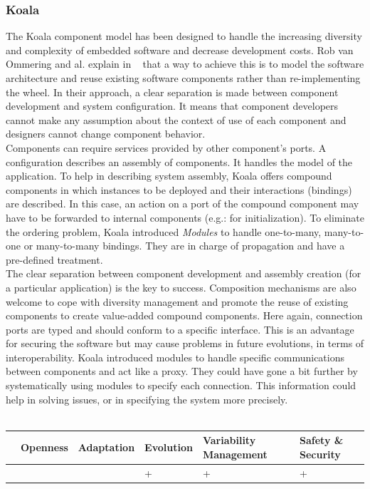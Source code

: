 \subsubsection{Koala}

The Koala component model has been designed to handle the increasing diversity and complexity of embedded software and decrease development costs. Rob van Ommering and al. explain in ~\cite{RobVanOmmering:2000} that a way to achieve this is to model the software architecture and reuse existing software components rather than re-implementing the wheel. In their approach, a clear separation is made between component development and system configuration. It means that component developers cannot make any assumption about the context of use of each component and designers cannot change component behavior.\\
Components can require services provided by other component's ports.
A configuration describes an assembly of components. It handles the model of the application. To help in describing system assembly, Koala offers compound components in which  instances to be deployed and their interactions (bindings) are described. In this case, an action on a port of the compound component may have to be forwarded to internal components (e.g.: for initialization). To eliminate the ordering problem, Koala introduced {\it Modules} to handle one-to-many, many-to-one or many-to-many bindings. They are in charge of propagation and have a pre-defined treatment.\\

The clear separation between component development and assembly creation (for a particular application) is the key to success. Composition mechanisms are also welcome to cope with diversity management and promote the reuse of existing components to create value-added compound components. Here again, connection ports are typed and should conform to a specific interface. This is an advantage for securing the software but may cause problems in future evolutions, in terms of interoperability. Koala introduced modules to handle specific communications between components and act like a proxy. They could have gone a bit further by systematically using modules to specify each connection. This information could help in solving issues, or in specifying the system more precisely.\\
\\
\begin{tabular}{ >{\centering}m{}| >{\centering}m{} >{\centering}m{}| >{\centering}m{} >{\centering}m{}| >{\centering\arraybackslash}m{}}
{\tiny Interoperability} & {\tiny Openness} & {\tiny Adaptation} & {\tiny Evolution} & {\tiny Variability Management} & {\tiny Safety \& Security}\\
 \hline
  &  &  & + & + & + \\ 
  \hline
\end{tabular}\\

